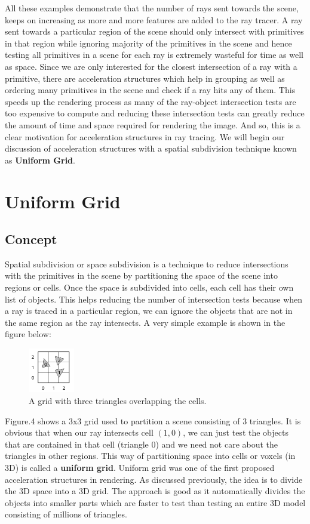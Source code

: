 \documentclass[11pt,a4paper]{article}
\begin{document}
All these examples demonstrate that the number of rays sent towards the scene, keeps on increasing as more and more features are added to the ray tracer. A ray sent towards a particular region of the scene should only intersect with primitives in that region while ignoring majority of the primitives in the scene and hence testing all primitives in a scene for each ray is extremely wasteful for time as well as space. Since we are only interested for the closest intersection of a ray with a primitive, there are acceleration structures which help in grouping as well as ordering many primitives in the scene and check if a ray hits any of them. This speeds up the rendering process as many of the ray-object intersection tests are too expensive to compute and reducing these intersection tests can greatly reduce the amount of time and space required for rendering the image. And so, this is a clear motivation for acceleration structures in ray tracing. We will begin our discussion of acceleration structures with a spatial subdivision technique known as \textbf{Uniform Grid}.

\section{Uniform Grid}
\subsection{Concept}
Spatial subdivision or space subdivision is a technique to reduce intersections with the primitives in the scene by partitioning the space of the scene into regions or cells. Once the space is subdivided into cells, each cell has their own list of objects. This helps reducing the number of intersection tests because when a ray is traced in a particular region, we can ignore the objects that are not in the same region as the ray intersects. A very simple example is shown in the figure below:
\begin{figure}[H]
	\centering
	\captionsetup{justification=centering,margin=2cm}
	\includegraphics[width=0.18\textwidth]{uniformgrids}
	\caption{A grid with three triangles overlapping the cells. \protect\cite{lagae2008compact}}
\end{figure}
Figure.4 shows a 3x3 grid used to partition a scene consisting of 3 triangles. It is obvious that when our ray intersects cell $(1, 0)$, we can just test the objects that are contained in that cell (triangle 0) and we need not care about the triangles in other regions. This way of partitioning space into cells or voxels (in 3D) is called a \textbf{uniform grid}.
Uniform grid was one of the first proposed acceleration structures \cite{fujimoto1986arts} in rendering. As discussed previously, the idea is to divide the 3D space into a 3D grid. The approach is good as it automatically divides the objects into smaller parts which are faster to test than testing an entire 3D model consisting of millions of triangles.
\end{document}
